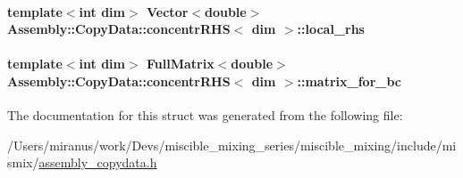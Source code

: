 \paragraph[{local\+\_\+rhs}]{\setlength{\rightskip}{0pt plus 5cm}template$<$int dim$>$ Vector$<$double$>$ {\bf Assembly\+::\+Copy\+Data\+::concentr\+R\+H\+S}$<$ dim $>$\+::local\+\_\+rhs}\label{struct_assembly_1_1_copy_data_1_1concentr_r_h_s_aa16d978b90728b2e6118f642cd012d53}
\hypertarget{struct_assembly_1_1_copy_data_1_1concentr_r_h_s_af68abcf2cce508ca241f8a57a4160b5d}{}
\paragraph[{matrix\+\_\+for\+\_\+bc}]{\setlength{\rightskip}{0pt plus 5cm}template$<$int dim$>$ Full\+Matrix$<$double$>$ {\bf Assembly\+::\+Copy\+Data\+::concentr\+R\+H\+S}$<$ dim $>$\+::matrix\+\_\+for\+\_\+bc}\label{struct_assembly_1_1_copy_data_1_1concentr_r_h_s_af68abcf2cce508ca241f8a57a4160b5d}


The documentation for this struct was generated from the following file\+:\begin{DoxyCompactItemize}
\item 
/\+Users/miranus/work/\+Devs/miscible\+\_\+mixing\+\_\+series/miscible\+\_\+mixing/include/mismix/\hyperlink{assembly__copydata_8h}{assembly\+\_\+copydata.\+h}\end{DoxyCompactItemize}
